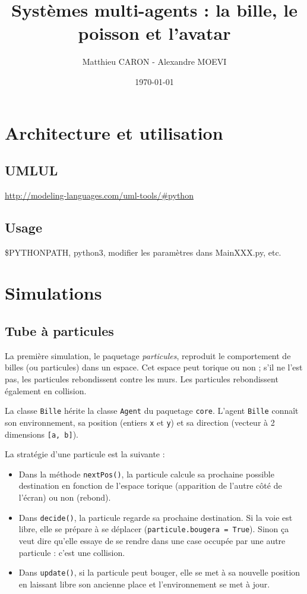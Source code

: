 \documentclass[a4paper]{article}
\title{Systèmes multi-agents : la bille, le poisson et l'avatar}
\author{Matthieu CARON - Alexandre MOEVI}
\date{\today}
\begin{document}
\maketitle

\section{Architecture et utilisation}

\subsection{UMLUL}
\url{http://modeling-languages.com/uml-tools/#python}

\subsection{Usage}

\$PYTHONPATH, python3, modifier les paramètres dans MainXXX.py, etc.
\section{Simulations}

\subsection{Tube à particules}

La première simulation, le paquetage \textit{particules}, reproduit le comportement de billes (ou particules) dans un espace. Cet espace peut torique ou non ; s'il ne l'est pas, les particules rebondissent contre les murs. Les particules rebondissent également en collision.

\medskip
La classe \texttt{Bille} hérite la classe \texttt{Agent} du paquetage \texttt{core}. L'agent \texttt{Bille} connaît son environnement, sa position (entiers \texttt{x} et \texttt{y}) et sa direction (vecteur à 2 dimensions \texttt{[a, b]}).

\medskip
La stratégie d'une particule est la suivante :
\begin{itemize}
\item Dans la méthode \texttt{nextPos()}, la particule calcule sa prochaine possible destination en fonction de l'espace torique (apparition de \og l'autre côté \fg{} de l'écran) ou non (rebond).
\item Dans \texttt{decide()}, la particule regarde sa prochaine destination. Si la voie est libre, elle se prépare à se déplacer (\texttt{particule.bougera = True}). Sinon ça veut dire qu'elle essaye de se rendre dans une case occupée par une autre particule : c'est une collision.
\item Dans \texttt{update()}, si la particule peut bouger, elle se met à sa nouvelle position en laissant libre son ancienne place et l'environnement se met à jour.
\end{itemize}
\end{document}
